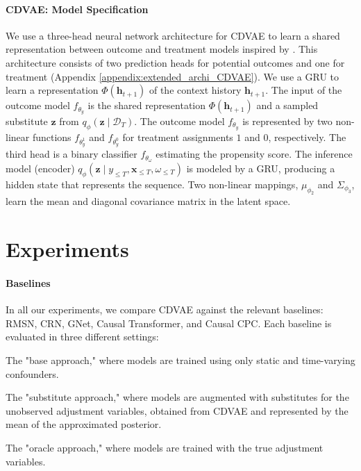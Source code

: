 \documentclass[10pt]{article} %
\begin{document}
\paragraph{CDVAE: Model Specification} \label{sect:CDVAE_archi}
We use a three-head neural network architecture for CDVAE to learn a shared representation between outcome and treatment models inspired by \cite{shi2019Dragonnet}. This architecture consists of two prediction heads for potential outcomes and one for treatment (Appendix \ref{appendix:extended_archi_CDVAE}). We use a GRU \citep{cho2014GRU} to learn a representation \(\Phi(\mathbf{h}_{t+1})\) of the context history \(\mathbf{h}_{t+1}\). The input of the outcome model  \(f_{\theta_{y}}\) is the shared representation \(\Phi(\mathbf{h}_{t+1})\) and a sampled substitute \(\mathbf{z}\) from  \(q_{\phi}(\mathbf{z} \mid \mathcal{D}_T) \). The outcome model \(f_{\theta_{y}}\) is represented by two non-linear functions \(f_{\theta_{y}^1}\) and \(f_{\theta_{y}^0}\) for treatment assignments \(1\) and \(0\), respectively. The third head is a binary classifier \(f_{\theta_{\omega}}\) estimating the propensity score. The inference model (encoder) \(q_\phi\left(\mathbf{z} \mid y_{\leq T}, \mathbf{x}_{\leq T}, \omega_{\leq T}\right)\) is modeled by a GRU, producing a hidden state that represents the sequence. Two non-linear mappings, \(\mu_{\phi_2}\) and \(\Sigma_{\phi_3}\), learn the mean and diagonal covariance matrix in the latent space.


\section{Experiments}
\label{sect:experiments}

\paragraph{Baselines} In all our experiments, we compare CDVAE against the relevant baselines: RMSN, CRN, GNet, Causal Transformer, and Causal CPC. Each baseline is evaluated in three different settings:  
\begin{inparaenum}
    \item The "base approach," where models are trained using only static and time-varying confounders.  
    \item The "substitute approach," where models are augmented with substitutes for the unobserved adjustment variables, obtained from CDVAE and represented by the mean of the approximated posterior.  
    \item The "oracle approach," where models are trained with the true adjustment variables.  
\end{inparaenum}
\end{document}
